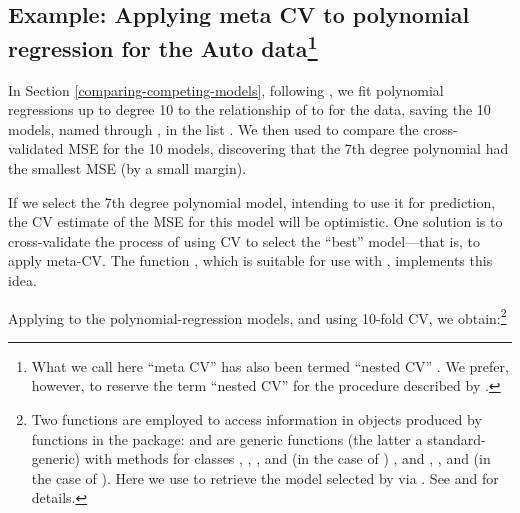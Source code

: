 \documentclass[
]{jss}
\begin{document}
\subsection[Example: Applying meta CV to polynomial regression for the
Auto data]{\texorpdfstring{Example: Applying meta CV to polynomial
regression for the Auto
data\footnote{What we call here ``meta CV'' has also been termed
  ``nested CV'' \citep[e.g., in the  package
  by][]{OlsenZachariae:2024}. We prefer, however, to reserve the term
  ``nested CV'' for the procedure described by
  \citet{BatesHastieTibshirani:2023}.}}{Example: Applying meta CV to polynomial regression for the Auto data}}\label{example-applying-meta-cv-to-polynomial-regression-for-the-auto-datameta-cv}

In Section \ref{comparing-competing-models}, following \citet[Secs. 5.1,
5.3]{JamesEtAl:2021}, we fit polynomial regressions up to degree 10 to
the relationship of  to  for the 
data, saving the 10 models, named  through , in the
list . We then used  to compare the
cross-validated MSE for the 10 models, discovering that the 7th degree
polynomial had the smallest MSE (by a small margin).

If we select the 7th degree polynomial model, intending to use it for
prediction, the CV estimate of the MSE for this model will be
optimistic. One solution is to cross-validate the process of using CV to
select the ``best'' model---that is, to apply meta-CV. The function
, which is suitable for use with ,
implements this idea.

Applying  to the 
polynomial-regression models, and using 10-fold CV, we
obtain:\footnote{Two functions are employed to access information in
  objects produced by functions in the  package: 
  and  are generic functions (the latter a
  standard- generic) with methods for classes ,
  , , and  (in the
  case of ) , and , , and
   (in the case of ). Here we
  use  to retrieve the model
  selected by  via . See 
  and  for details.}
\end{document}
